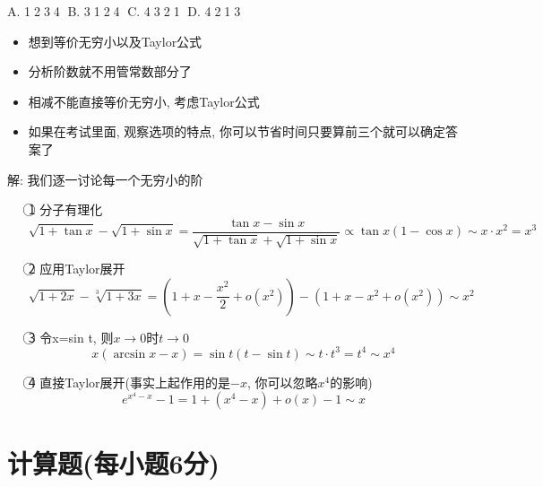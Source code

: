 \documentclass[10pt]{SelfArx} %
\numberwithin{dummy}{section}
\newenvironment{corollary}{\begin{cBox}\noindent{\bf\color{color1} 分析}}{\end{cBox}}
\begin{document}
A. \textcircled{1}\textcircled{2}\textcircled{3}\textcircled{4}
B. \textcircled{3}\textcircled{1}\textcircled{2}\textcircled{4}
C. \textcircled{4}\textcircled{3}\textcircled{2}\textcircled{1}
D. \textcircled{4}\textcircled{2}\textcircled{1}\textcircled{3}
\begin{corollary}
	\begin{itemize}
		\item 想到等价无穷小以及Taylor公式
		\item 分析阶数就不用管常数部分了
		\item 相减不能直接等价无穷小, 考虑Taylor公式
		\item 如果在考试里面, 观察选项的特点, 你可以节省时间只要算前三个就可以确定答案了
	\end{itemize}
\end{corollary}
解: 我们逐一讨论每一个无穷小的阶
\begin{enumerate}
	\item[\textcircled{1}] 分子有理化
		\begin{displaymath}
			\sqrt{1+\tan x}-\sqrt{1+\sin x}=\displaystyle\frac{\tan x-\sin x}{\sqrt{1+\tan x}+\sqrt{1+\sin x}}\propto\tan x(1-\cos x)\sim x\cdot x^2=x^3
		\end{displaymath}
	\item[\textcircled{2}] 应用Taylor展开
		\begin{displaymath}
			\sqrt{1+2x}-\sqrt[3]{1+3x}=(1+x-\displaystyle\frac{x^2}{2}+o(x^2))-(1+x-x^2+o(x^2))\sim x^2
		\end{displaymath}
	\item[\textcircled{3}] 令x=sin t, 则$x\to 0$时$t\to 0$
		\begin{displaymath}
			x(\arcsin x-x)=\sin t(t-\sin t)\sim t\cdot t^3=t^4\sim x^4
		\end{displaymath}
	\item[\textcircled{4}] 直接Taylor展开(事实上起作用的是$-x$, 你可以忽略$x^4$的影响)
		\begin{displaymath}
			e^{x^4-x}-1=1+(x^4-x)+o(x)-1\sim x
		\end{displaymath}
\end{enumerate}

\section[计算题]{计算题(每小题6分)}
\end{document}
